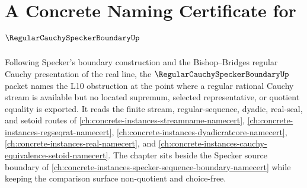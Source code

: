 \chapter{A Concrete Naming Certificate for $\RegularCauchySpeckerBoundaryUp$}
\label{ch:concrete-instances-regular-cauchy-specker-boundary-namecert}

Following Specker's boundary construction and the Bishop--Bridges regular Cauchy presentation of the real line, the $\RegularCauchySpeckerBoundaryUp$ packet names the L10 obstruction at the point where a regular rational Cauchy stream is available but no located supremum, selected representative, or quotient equality is exported. It reads the finite stream, regular-sequence, dyadic, real-seal, and setoid routes of \autoref{ch:concrete-instances-streamname-namecert}, \autoref{ch:concrete-instances-regseqrat-namecert}, \autoref{ch:concrete-instances-dyadicratcore-namecert}, \autoref{ch:concrete-instances-real-namecert}, and \autoref{ch:concrete-instances-cauchy-equivalence-setoid-namecert}. The chapter sits beside the Specker source boundary of \autoref{ch:concrete-instances-specker-sequence-boundary-namecert} while keeping the comparison surface non-quotient and choice-free.

